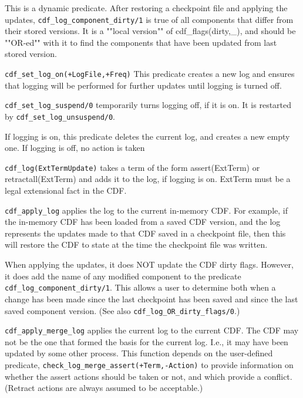 \begin{description}
This is a dynamic predicate.  After restoring a checkpoint file and
applying the updates, {\tt cdf\_log\_component\_dirty/1} is true of all
components that differ from their stored versions.  It is a ""local
version"" of cdf\_flags(dirty,\_), and should be ""OR-ed"" with it to
find the components that have been updated from last stored version.

{\tt cdf\_set\_log\_on(+LogFile,+Freq)} This predicate creates a new log
and ensures that logging will be performed for further updates until
logging is turned off.

 {\tt cdf\_set\_log\_suspend/0}
temporarily turns logging off, if it is on.  It is restarted by
{\tt cdf\_set\_log\_unsuspend/0}.

 If logging is on, this predicate deletes
the current log, and creates a new empty one.  If logging is off, no
action is taken

{\tt cdf\_log(ExtTermUpdate)} takes a term of the form assert(ExtTerm)
or retractall(ExtTerm) and adds it to the log, if logging is on.
ExtTerm must be a legal extensional fact in the CDF.

{\tt cdf\_apply\_log} applies the log to the current in-memory CDF.  For
example, if the in-memory CDF has been loaded from a saved CDF
version, and the log represents the updates made to that CDF saved in
a checkpoint file, then this will restore the CDF to state at the time
the checkpoint file was written.

When applying the updates, it does NOT update the CDF dirty flags.
However, it does add the name of any modified component to the
predicate {\tt cdf\_log\_component\_dirty/1}.  This allows a user to
determine both when a change has been made since the last checkpoint
has been saved and since the last saved component version.  (See also
{\tt cdf\_log\_OR\_dirty\_flags/0}.) 

{\tt cdf\_apply\_merge\_log} applies the current log to the current CDF.
The CDF may not be the one that formed the basis for the current log.
I.e., it may have been updated by some other process.  This function
depends on the user-defined predicate,
{\tt check\_log\_merge\_assert(+Term,-Action)} to provide information on
whether the assert actions should be taken or not, and which provide a
conflict.  (Retract actions are always assumed to be acceptable.)


\end{description}
